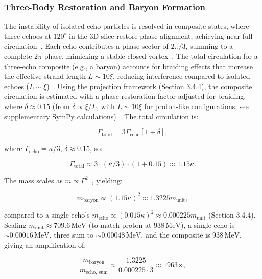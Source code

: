 \subsubsection{Three-Body Restoration and Baryon Formation}

The instability of isolated echo particles is resolved in composite states, where three echoes at \(120^\circ\) in the 3D slice restore phase alignment, achieving near-full circulation~\cite{Nitta2019}. Each echo contributes a phase sector of \(2\pi/3\), summing to a complete \(2\pi\) phase, mimicking a stable closed vortex~\cite{WikiFractional}. The total circulation for a three-echo composite (e.g., a baryon) accounts for braiding effects that increase the effective strand length \(L \sim 10 \xi\), reducing interference compared to isolated echoes (\(L \sim \xi\))~\cite{Wimmer2020}. Using the projection framework (Section 3.4.4), the composite circulation is estimated with a phase restoration factor adjusted for braiding, where \(\delta \approx 0.15\) (from \(\delta \propto \xi / L\), with \(L \sim 10 \xi\) for proton-like configurations, see supplementary SymPy calculations)~\cite{NatComm2023}. The total circulation is:

\begin{equation}
\Gamma_{\text{total}} = 3 \Gamma_{\text{echo}} \left[ 1 + \delta \right],
\end{equation}

where \(\Gamma_{\text{echo}} = \kappa/3\), \(\delta \approx 0.15\), so:

\begin{equation}
\Gamma_{\text{total}} \approx 3 \cdot \left( \kappa/3 \right) \cdot (1 + 0.15) \approx 1.15 \kappa.
\end{equation}

The mass scales as \(m \propto \Gamma^2\)~\cite{Lake2010}, yielding:

\begin{equation}
m_{\text{baryon}} \propto (1.15 \kappa)^2 \approx 1.3225 m_{\text{unit}},
\end{equation}

compared to a single echo's \(m_{\text{echo}} \propto (0.015 \kappa)^2 \approx 0.000225 m_{\text{unit}}\) (Section 3.4.4). Scaling \(m_{\text{unit}} \approx 709.6 \, \text{MeV}\) (to match proton at \(938 \, \text{MeV}\)), a single echo is \(\sim 0.00016 \, \text{MeV}\), three sum to \(\sim 0.00048 \, \text{MeV}\), and the composite is \(938 \, \text{MeV}\), giving an amplification of:

\begin{equation}
\frac{m_{\text{baryon}}}{m_{\text{echo, sum}}} \approx \frac{1.3225}{0.000225 \cdot 3} \approx 1963 \times,
\end{equation}

